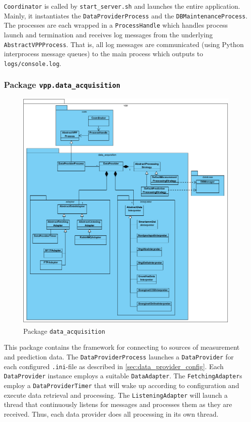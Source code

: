 \texttt{Coordinator} is called by \texttt{start\_server.sh} and launches the entire application. Mainly, it instantiates the \texttt{DataProviderProcess} and the \texttt{DBMaintenanceProcess}. The processes are each wrapped in a \texttt{ProcessHandle} which handles process launch and termination and receives log messages from the underlying  \texttt{AbstractVPPProcess}. That is, all log messages are communicated (using Python interprocess message queues) to the main process which outputs to \texttt{logs/console.log}.


\subsubsection{Package \texttt{vpp.data\_acquisition}}

\begin{figure}[H]
    \centering
    \includegraphics[width=\textwidth]{figures/class_data_acquisition}
    \caption{Package \texttt{data\_acquisition}}
\end{figure}

This package contains the framework for connecting to sources of measurement and prediction data. The \texttt{DataProviderProcess} launches a \texttt{DataProvider} for each configured \texttt{.ini}-file as described in \ref{sec:data_provider_config}. Each \texttt{DataProvider} instance employs a suitable \texttt{DataAdapter}. The \texttt{FetchingAdapter}s employ a \texttt{DataProviderTimer} that will wake up according to configuration and execute data retrieval and processing. The \texttt{ListeningAdapter} will launch a thread that continuously listens for messages and processes them as they are received. Thus, each data provider does all processing in its own thread.

